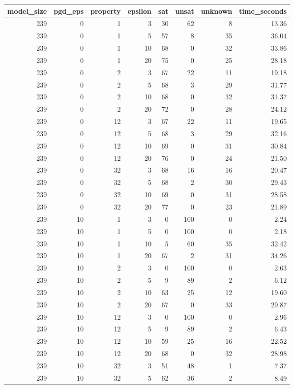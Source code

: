 \begin{tabular}{rrrrrrrr}
\toprule
model\_size & pgd\_eps & property & epsilon & sat & unsat & unknown & time\_seconds \\
\midrule
239 & 0 & 1 & 3 & 30 & 62 & 8 & 13.36 \\
239 & 0 & 1 & 5 & 57 & 8 & 35 & 36.04 \\
239 & 0 & 1 & 10 & 68 & 0 & 32 & 33.86 \\
239 & 0 & 1 & 20 & 75 & 0 & 25 & 28.18 \\
239 & 0 & 2 & 3 & 67 & 22 & 11 & 19.18 \\
239 & 0 & 2 & 5 & 68 & 3 & 29 & 31.77 \\
239 & 0 & 2 & 10 & 68 & 0 & 32 & 31.37 \\
239 & 0 & 2 & 20 & 72 & 0 & 28 & 24.12 \\
239 & 0 & 12 & 3 & 67 & 22 & 11 & 19.65 \\
239 & 0 & 12 & 5 & 68 & 3 & 29 & 32.16 \\
239 & 0 & 12 & 10 & 69 & 0 & 31 & 30.84 \\
239 & 0 & 12 & 20 & 76 & 0 & 24 & 21.50 \\
239 & 0 & 32 & 3 & 68 & 16 & 16 & 20.47 \\
239 & 0 & 32 & 5 & 68 & 2 & 30 & 29.43 \\
239 & 0 & 32 & 10 & 69 & 0 & 31 & 28.58 \\
239 & 0 & 32 & 20 & 77 & 0 & 23 & 21.89 \\
239 & 10 & 1 & 3 & 0 & 100 & 0 & 2.24 \\
239 & 10 & 1 & 5 & 0 & 100 & 0 & 2.18 \\
239 & 10 & 1 & 10 & 5 & 60 & 35 & 32.42 \\
239 & 10 & 1 & 20 & 67 & 2 & 31 & 34.26 \\
239 & 10 & 2 & 3 & 0 & 100 & 0 & 2.63 \\
239 & 10 & 2 & 5 & 9 & 89 & 2 & 6.12 \\
239 & 10 & 2 & 10 & 63 & 25 & 12 & 19.60 \\
239 & 10 & 2 & 20 & 67 & 0 & 33 & 29.87 \\
239 & 10 & 12 & 3 & 0 & 100 & 0 & 2.96 \\
239 & 10 & 12 & 5 & 9 & 89 & 2 & 6.43 \\
239 & 10 & 12 & 10 & 59 & 25 & 16 & 22.52 \\
239 & 10 & 12 & 20 & 68 & 0 & 32 & 28.98 \\
239 & 10 & 32 & 3 & 51 & 48 & 1 & 7.37 \\
239 & 10 & 32 & 5 & 62 & 36 & 2 & 8.49 \\

\end{tabular}
